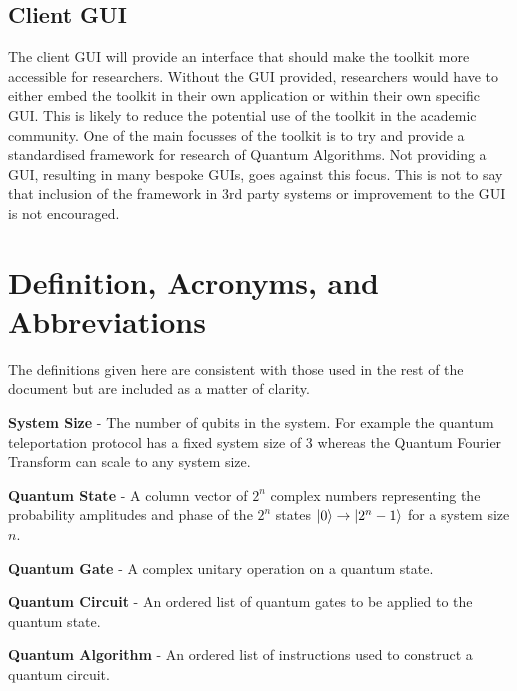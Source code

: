\documentclass[authoryearcitations]{UoYCSproject}
\begin{document}
\subsection{Client GUI}
The client GUI will provide an interface that should make the toolkit more accessible for researchers.
Without the GUI provided, researchers would have to either embed the toolkit in their own application or within their own specific GUI.
This is likely to reduce the potential use of the toolkit in the academic community.
One of the main focusses of the toolkit is to try and provide a standardised framework for research of Quantum Algorithms.
Not providing a GUI, resulting in many bespoke GUIs, goes against this focus.
This is not to say that inclusion of the framework in 3rd party systems or improvement to the GUI is not encouraged.

% 

\section{Definition, Acronyms, and Abbreviations}
The definitions given here are consistent with those used in the rest of the document but are included as a matter of clarity.

\textbf{System Size} - The number of qubits in the system. For example the quantum teleportation protocol has a fixed system size of 3 whereas the Quantum Fourier Transform can scale to any system size.

\textbf{Quantum State} - A column vector of $2^n$ complex numbers representing the probability amplitudes and phase of the $2^n$ states $\left\vert{0}\right\rangle\rightarrow\left\vert{2^n-1}\right\rangle$ for a system size $n$.

\textbf{Quantum Gate} - A complex unitary operation on a quantum state.

\textbf{Quantum Circuit} - An ordered list of quantum gates to be applied to the quantum state.

\textbf{Quantum Algorithm} - An ordered list of instructions used to construct a quantum circuit.
\end{document}
